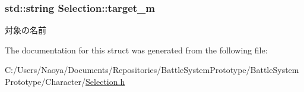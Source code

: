 \subsubsection[{target\+\_\+m}]{\setlength{\rightskip}{0pt plus 5cm}std\+::string Selection\+::target\+\_\+m}\label{struct_selection_a1b21fefdc3fa3795f1c0a4701e9f8ee9}
対象の名前 

The documentation for this struct was generated from the following file\+:\begin{DoxyCompactItemize}
\item 
C\+:/\+Users/\+Naoya/\+Documents/\+Repositories/\+Battle\+System\+Prototype/\+Battle\+System\+Prototype/\+Character/\hyperlink{_selection_8h}{Selection.\+h}\end{DoxyCompactItemize}
